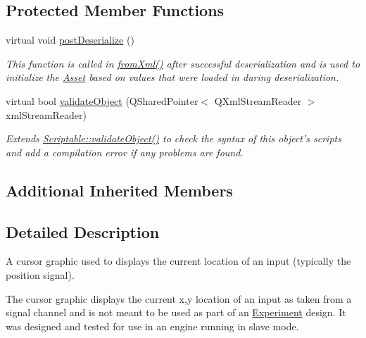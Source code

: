 \subsection*{Protected Member Functions}
\begin{DoxyCompactItemize}
\item 
virtual void \hyperlink{class_picto_1_1_cursor_graphic_ac2e7c774d4ce4df03b47e2095c400a3e}{post\-Deserialize} ()
\begin{DoxyCompactList}\small\item\em This function is called in \hyperlink{class_picto_1_1_asset_a8bed4da09ecb1c07ce0dab313a9aba67}{from\-Xml()} after successful deserialization and is used to initialize the \hyperlink{class_picto_1_1_asset}{Asset} based on values that were loaded in during deserialization. \end{DoxyCompactList}\item 
\hypertarget{class_picto_1_1_cursor_graphic_acd8db3afbc8485e4563f1fbafe61911d}{virtual bool \hyperlink{class_picto_1_1_cursor_graphic_acd8db3afbc8485e4563f1fbafe61911d}{validate\-Object} (Q\-Shared\-Pointer$<$ Q\-Xml\-Stream\-Reader $>$ xml\-Stream\-Reader)}\label{class_picto_1_1_cursor_graphic_acd8db3afbc8485e4563f1fbafe61911d}

\begin{DoxyCompactList}\small\item\em Extends \hyperlink{class_picto_1_1_scriptable_ab6e2944c43a3b5d418bf7b251594386d}{Scriptable\-::validate\-Object()} to check the syntax of this object's scripts and add a compilation error if any problems are found. \end{DoxyCompactList}\end{DoxyCompactItemize}
\subsection*{Additional Inherited Members}


\subsection{Detailed Description}
A cursor graphic used to displays the current location of an input (typically the position signal). 

The cursor graphic displays the current x,y location of an input as taken from a signal channel and is not meant to be used as part of an \hyperlink{class_picto_1_1_experiment}{Experiment} design. It was designed and tested for use in an engine running in slave mode.

